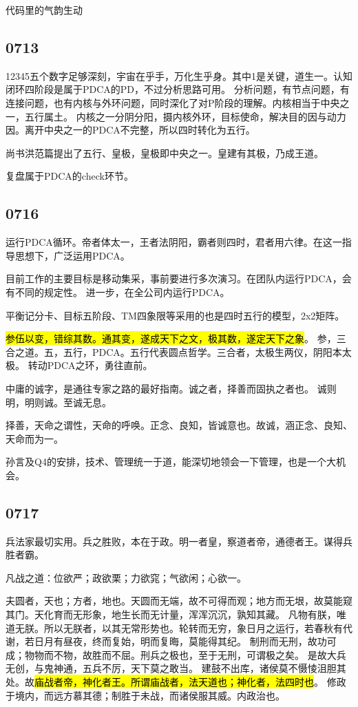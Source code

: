 代码里的气韵生动

\subsection{0713}

12345五个数字足够深刻，宇宙在乎手，万化生乎身。其中1是关键，道生一。认知闭环四阶段是属于PDCA的PD，不过分析思路可用。
分析问题，有节点问题，有连接问题，也有内核与外环问题，同时深化了对P阶段的理解。内核相当于中央之一，五行属土。
内核之一分阴分阳，摄内核外环，目标使命，解决目的因与动力因。离开中央之一的PDCA不完整，所以四时转化为五行。

尚书洪范篇提出了五行、皇极，皇极即中央之一。皇建有其极，乃成王道。

复盘属于PDCA的check环节。

\subsection{0716}

运行PDCA循环。帝者体太一，王者法阴阳，霸者则四时，君者用六律。在这一指导思想下，广泛运用PDCA。

目前工作的主要目标是移动集采，事前要进行多次演习。在团队内运行PDCA，会有不同的规定性。
进一步，在全公司内运行PDCA。

平衡记分卡、目标五阶段、TM四象限等采用的也是四时五行的模型，2x2矩阵。

\hl{参伍以变，错综其数。通其变，遂成天下之文，极其数，遂定天下之象}。
参，三合之道。五，五行，PDCA。五行代表圆点哲学。三合者，太极生两仪，阴阳本太极。
转动PDCA之环，勇往直前。

中庸的诚字，是通往专家之路的最好指南。诚之者，择善而固执之者也。
诚则明，明则诚。至诚无息。

择善，天命之谓性，天命的呼唤。正念、良知，皆诚意也。故诚，涵正念、良知、天命而为一。

孙言及Q4的安排，技术、管理统一于道，能深切地领会一下管理，也是一个大机会。

\subsection{0717}

兵法家最切实用。兵之胜败，本在于政。明一者皇，察道者帝，通德者王。谋得兵胜者霸。

凡战之道：位欲严；政欲栗；力欲窕；气欲闲；心欲一。

夫圆者，天也；方者，地也。天圆而无端，故不可得而观；地方而无垠，故莫能窥其门。天化育而无形象，地生长而无计量，浑浑沉沉，孰知其藏。
凡物有朕，唯道无朕。所以无朕者，以其无常形势也。轮转而无穷，象日月之运行，若春秋有代谢，若日月有昼夜，终而复始，明而复晦，莫能得其纪。
制刑而无刑，故功可成；物物而不物，故胜而不屈。刑兵之极也，至于无刑，可谓极之矣。
是故大兵无创，与鬼神通，五兵不厉，天下莫之敢当。
建鼓不出库，诸侯莫不慑㥄沮胆其处。故\hl{庙战者帝，神化者王。所谓庙战者，法天道也；神化者，法四时也}。
修政于境内，而远方慕其德；制胜于未战，而诸侯服其威。内政治也。


